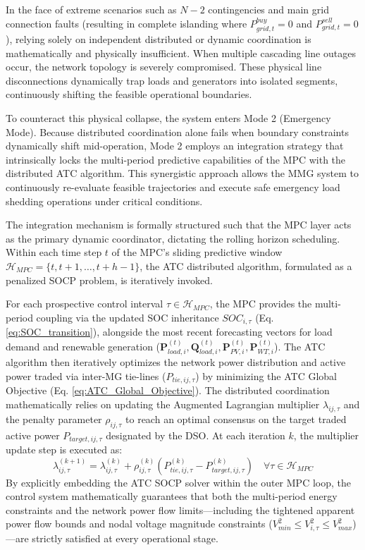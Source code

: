 In the face of extreme scenarios such as $N-2$ contingencies and main grid connection faults (resulting in complete islanding where $P_{grid,t}^{buy} = 0$ and $P_{grid,t}^{sell} = 0$), relying solely on independent distributed or dynamic coordination is mathematically and physically insufficient. When multiple cascading line outages occur, the network topology is severely compromised. These physical line disconnections dynamically trap loads and generators into isolated segments, continuously shifting the feasible operational boundaries.

To counteract this physical collapse, the system enters Mode 2 (Emergency Mode). Because distributed coordination alone fails when boundary constraints dynamically shift mid-operation, Mode 2 employs an integration strategy that intrinsically locks the multi-period predictive capabilities of the MPC with the distributed ATC algorithm. This synergistic approach allows the MMG system to continuously re-evaluate feasible trajectories and execute safe emergency load shedding operations under critical conditions.

The integration mechanism is formally structured such that the MPC layer acts as the primary dynamic coordinator, dictating the rolling horizon scheduling. Within each time step $t$ of the MPC's sliding predictive window $\mathcal{H}_{MPC} = \{t, t+1, \dots, t+h-1\}$, the ATC distributed algorithm, formulated as a penalized SOCP problem, is iteratively invoked. 

For each prospective control interval $\tau \in \mathcal{H}_{MPC}$, the MPC provides the multi-period coupling via the updated SOC inheritance $SOC_{i,\tau}$ (Eq. \ref{eq:SOC_transition}), alongside the most recent forecasting vectors for load demand and renewable generation ($\mathbf{P}_{load,i}^{(t)}, \mathbf{Q}_{load,i}^{(t)}, \mathbf{P}_{PV,i}^{(t)}, \mathbf{P}_{WT,i}^{(t)}$). The ATC algorithm then iteratively optimizes the network power distribution and active power traded via inter-MG tie-lines ($P_{tie,ij,\tau}$) by minimizing the ATC Global Objective (Eq. \ref{eq:ATC_Global_Objective}). The distributed coordination mathematically relies on updating the Augmented Lagrangian multiplier $\lambda_{ij,\tau}$ and the penalty parameter $\rho_{ij,\tau}$ to reach an optimal consensus on the target traded active power $P_{target,ij,\tau}$ designated by the DSO. At each iteration $k$, the multiplier update step is executed as:
\begin{equation} \label{eq:Multiplier_Update}
    \lambda_{ij,\tau}^{(k+1)} = \lambda_{ij,\tau}^{(k)} + \rho_{ij,\tau}^{(k)} \left( P_{tie,ij,\tau}^{(k)} - P_{target,ij,\tau}^{(k)} \right) \quad \forall \tau \in \mathcal{H}_{MPC}
\end{equation}
By explicitly embedding the ATC SOCP solver within the outer MPC loop, the control system mathematically guarantees that both the multi-period energy constraints and the network power flow limits—including the tightened apparent power flow bounds and nodal voltage magnitude constraints ($V_{min}^2 \leq V_{i,\tau}^2 \leq V_{max}^2$)—are strictly satisfied at every operational stage.

